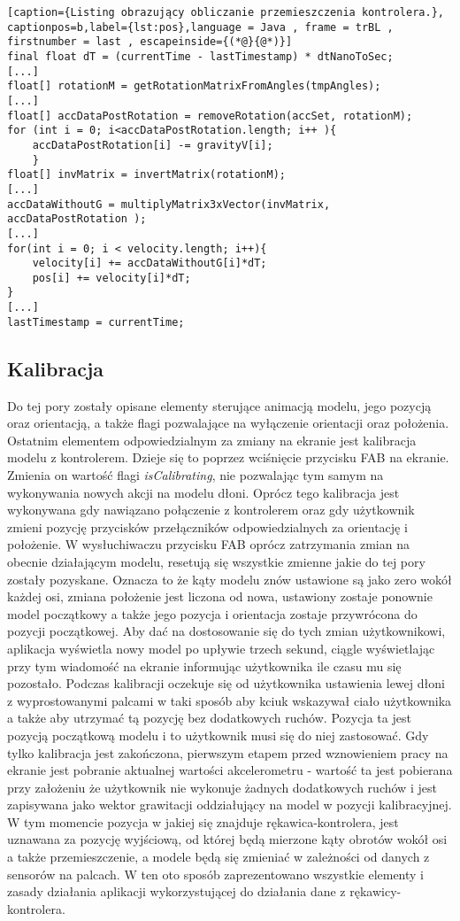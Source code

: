 	\begin{lstlisting}[caption={Listing obrazujący obliczanie przemieszczenia kontrolera.}, captionpos=b,label={lst:pos},language = Java , frame = trBL , firstnumber = last , escapeinside={(*@}{@*)}]  
final float dT = (currentTime - lastTimestamp) * dtNanoToSec;
[...]	   
float[] rotationM = getRotationMatrixFromAngles(tmpAngles);
[...]
float[] accDataPostRotation = removeRotation(accSet, rotationM);
for (int i = 0; i<accDataPostRotation.length; i++ ){
	accDataPostRotation[i] -= gravityV[i];
    }
float[] invMatrix = invertMatrix(rotationM);
[...]
accDataWithoutG = multiplyMatrix3xVector(invMatrix, accDataPostRotation );
[...]
for(int i = 0; i < velocity.length; i++){
	velocity[i] += accDataWithoutG[i]*dT;
	pos[i] += velocity[i]*dT;
}
[...]
lastTimestamp = currentTime;
\end{lstlisting}
	
	\subsection{Kalibracja}
	\label{subsec:kalibracja}
	Do tej pory zostały opisane elementy sterujące animacją modelu, jego pozycją oraz orientacją, a także flagi pozwalające na wyłączenie orientacji oraz położenia. Ostatnim elementem odpowiedzialnym za zmiany na ekranie jest kalibracja modelu z kontrolerem. Dzieje się to poprzez wciśnięcie przycisku FAB na ekranie. Zmienia on wartość flagi \textit{isCalibrating}, nie pozwalając tym samym na wykonywania nowych akcji na modelu dłoni. Oprócz tego kalibracja jest wykonywana gdy nawiązano połączenie z kontrolerem oraz gdy użytkownik zmieni pozycję przycisków przełączników odpowiedzialnych za orientację i położenie. W wysłuchiwaczu przycisku FAB oprócz zatrzymania zmian na obecnie działającym modelu, resetują się wszystkie zmienne jakie do tej pory zostały pozyskane. Oznacza to że kąty modelu znów ustawione są jako zero wokół każdej osi, zmiana położenie jest liczona od nowa, ustawiony zostaje ponownie model początkowy a także jego pozycja i orientacja zostaje przywrócona do pozycji początkowej. Aby dać na dostosowanie się do tych zmian użytkownikowi, aplikacja wyświetla nowy model po upływie trzech sekund, ciągle wyświetlając przy tym wiadomość na ekranie informując użytkownika ile czasu mu się pozostało. Podczas kalibracji oczekuje się od użytkownika ustawienia lewej dłoni z wyprostowanymi palcami w taki sposób aby kciuk wskazywał ciało użytkownika a także aby utrzymać tą pozycję bez dodatkowych ruchów. Pozycja ta jest pozycją początkową modelu i to użytkownik musi się do niej zastosować. Gdy tylko kalibracja jest zakończona, pierwszym etapem przed wznowieniem pracy na ekranie jest pobranie aktualnej wartości akcelerometru - wartość ta jest pobierana przy założeniu że użytkownik nie wykonuje żadnych dodatkowych ruchów i jest zapisywana jako wektor grawitacji oddziałujący na model w pozycji kalibracyjnej. W tym momencie pozycja w jakiej się znajduje rękawica-kontrolera, jest uznawana za pozycję wyjściową, od której będą mierzone kąty obrotów wokół osi a także przemieszczenie, a modele będą się zmieniać w zależności od danych z sensorów na palcach. W ten oto sposób zaprezentowano wszystkie elementy i zasady działania aplikacji wykorzystującej do działania dane z rękawicy-kontrolera.
	
	

